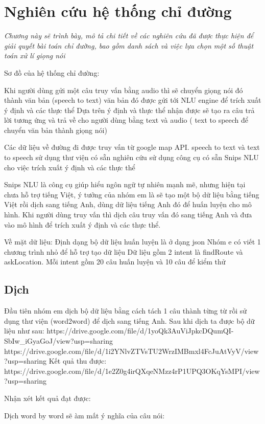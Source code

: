 \chapter{Nghiên cứu hệ thống chỉ đường}
\label{Chapter3}

\emph{Chương này sẽ trình bày, mô tả chi tiết về các nghiên cứu đã được thực hiện để giải quyết bài toán chỉ đường, bao gồm danh sách và việc lựa chọn một số thuật toán xử lí giọng nói
}

Sơ đồ của hệ thống chỉ đường: 


Khi người dùng gửi một câu truy vấn bằng audio thì sẽ chuyển giọng nói đó thành văn bản (speech to text) 
văn bản đó được gửi tới NLU engine để trích xuất ý định và các thực thể 
Dựa trên ý định và thực thể nhận được sẽ tạo ra câu trả lời tương ứng và trả về cho người dùng bằng text và audio ( text to speech để chuyển văn bản thành giọng nói) 

Các dữ liệu về đường đi được truy vấn từ google map API. 
speech to text và text to speech sử dụng thư viện có sẵn
nghiên cứu sử dụng công cụ có sẵn Snips NLU cho việc trích xuất ý định và các thực thể 

Snips NLU là công cụ giúp hiểu ngôn ngữ tự nhiên mạnh mẽ, nhưng hiện tại chưa hỗ trợ tiếng Việt, ý tưởng của nhóm em là sẽ tạo một bộ dữ liệu bằng tiếng Việt rồi dịch sang tiếng Anh, dùng dữ liệu tiếng Anh đó để huấn luyện cho mô hình. Khi người dùng truy vấn thì dịch câu truy vấn đó sang tiếng Anh và đưa vào mô hình để trích xuất ý định và các thực thể. 

Về mặt dữ liệu:
Định dạng bộ dữ liệu huấn luyện là ở dạng json 
Nhóm e có viết 1 chương trình nhỏ để hỗ trợ tạo dữ liệu
Dữ liệu gồm 2 intent là findRoute và askLocation. Mỗi intent gồm 20 câu huấn luyện và 10 câu để kiểm thử 
\section{Dịch}
Đầu tiên nhóm em dịch bộ dữ liệu bằng cách tách 1 câu thành từng từ rồi sử dụng thư viện (word2word) để dịch sang tiếng Anh.
Sau khi dịch ta được bộ dữ liệu như sau:
https://drive.google.com/file/d/1yoQk3AuViJpkcDQumQI-SbIw_iGyaGoJ/view?usp=sharing
https://drive.google.com/file/d/1i2YNlvZTVsTU2WrzIMBmxl4FcJuAtVyV/view?usp=sharing
Kết quả thu được: 
https://drive.google.com/file/d/1e2Z0g4irQXqeNMzz4rP1UPQ3OKqYsMPI/view?usp=sharing

Nhận xét kết quả đạt được: 

Dịch word by word sẽ àm mất ý nghĩa của câu nói: 

